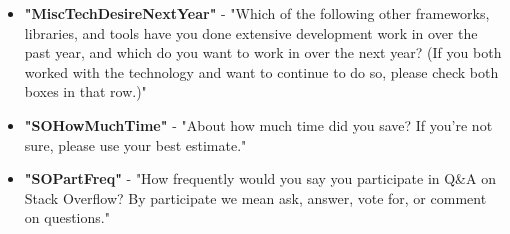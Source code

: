 \begin{appendices}
\begin{itemize}
        \item \textbf{"MiscTechDesireNextYear"} - "Which of the following other frameworks, libraries, and tools have you done extensive development work in over the past year, and which do you want to work in over the next year? (If you both worked with the technology and want to continue to do so, please check both boxes in that row.)"
        \item \textbf{"SOHowMuchTime"} - "About how much time did you save? If you're not sure, please use your best estimate."
        \item \textbf{"SOPartFreq"} - "How frequently would you say you participate in Q&A on Stack Overflow? By participate we mean ask, answer, vote for, or comment on questions."
    \end{itemize}
\end{appendices}
\thispagestyle{normal}
